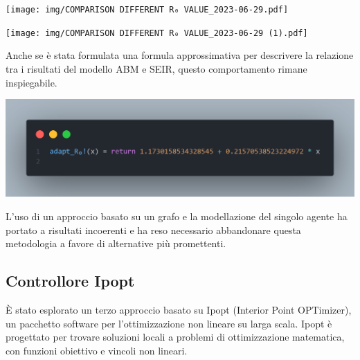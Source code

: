 \begin{minipage}{\linewidth}
    \centering
    \texttt{[image: img/COMPARISON DIFFERENT R₀ VALUE\_2023-06-29.pdf]}
    \label{fig:strange_behaviour_R0_abm}
\end{minipage}

\begin{minipage}{\linewidth}
    \centering
    \texttt{[image: img/COMPARISON DIFFERENT R₀ VALUE\_2023-06-29 (1).pdf]}
    \label{fig:strange_behaviour_R0_ode}
\end{minipage}

Anche se è stata formulata una formula approssimativa per 
descrivere la relazione tra i risultati del modello ABM e SEIR, 
questo comportamento rimane inspiegabile. 

\begin{minipage}{\linewidth}
    \centering
    \includegraphics[width=\textwidth]{img/rapporto_strano.png}
    \label{fig:strange_behaviour_R0}
\end{minipage}

L'uso di un approccio basato su un grafo e la modellazione del 
singolo agente ha portato a risultati incoerenti e ha reso necessario 
abbandonare questa metodologia a favore di alternative più promettenti.
\newpage

\subsection{Controllore Ipopt}

È stato esplorato un terzo approccio basato su Ipopt 
(Interior Point OPTimizer), un pacchetto software per l'ottimizzazione 
non lineare su larga scala. Ipopt è progettato per trovare soluzioni 
locali a problemi di ottimizzazione matematica, con funzioni obiettivo e 
vincoli non lineari. \cite{Wächter2006}


